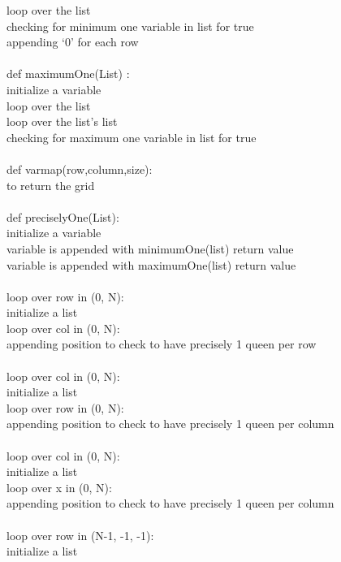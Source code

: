 \documentclass[12pt, letterpaper]{article}
\begin{document}
\indent   loop over the list\\
\indent  \indent	checking for minimum one variable in list for true\\
\indent    appending ‘0’ for each row\\
\\def maximumOne(List) :\\
\indent    initialize a variable\\
\indent    loop over the list\\
\indent \indent	loop over the list’s list\\
\indent \indent	 checking for maximum one variable in list for true\\
\\def varmap(row,column,size):\\
\indent    to return the grid\\
\\def preciselyOne(List):\\
\indent    initialize a variable\\
\indent    variable is appended with minimumOne(list) return value\\
\indent    variable is appended with maximumOne(list) return value\\
\\loop over row in (0, N): \\
\indent \indent	initialize a list  \\
\indent \indent    	loop over col in (0, N):\\
\indent        appending position to check to have precisely 1 queen per row\\
\\loop over col in (0, N): \\
\indent \indent	initialize a list  \\
\indent \indent    	loop over row in (0, N):\\
\indent        appending position to check to have precisely 1 queen per column\\
\\loop over col in (0, N): \\
\indent \indent	initialize a list  \\
\indent \indent    	loop over x in (0, N):\\
\indent        appending position to check to have precisely 1 queen per column\\
\\loop over row in (N-1, -1, -1): \\
\indent \indent	initialize a list  \\
\end{document}
